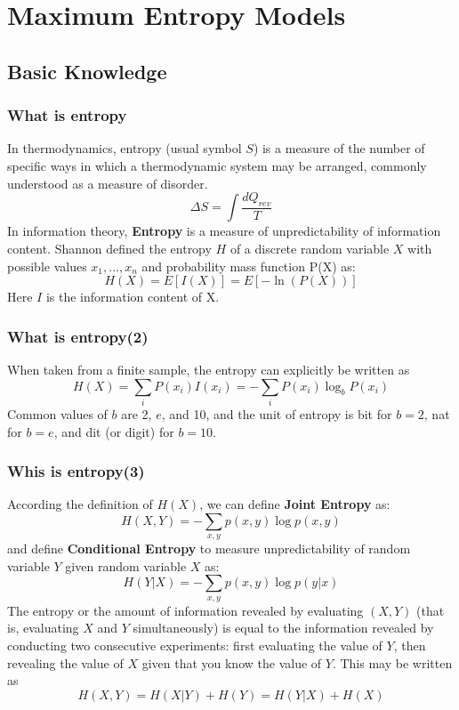 \documentclass[slidestop,compress,mathserif]{beamer}
\begin{document}
	\section{Maximum Entropy Models}
	\subsection{Basic Knowledge}
	\begin{frame}
		\frametitle{What is entropy}
		In thermodynamics, entropy (usual symbol $S$) is a measure of the number of specific ways in which a thermodynamic system may be arranged, commonly understood as a measure of disorder.
		$$\Delta S = \int\frac{dQ_{rev}}{T}$$
		In information theory, \textbf{Entropy} is a measure of unpredictability of information content. Shannon defined the entropy $H$ of a discrete random variable $X$ with possible values $x_1, ..., x_n$ and probability mass function P(X) as:
		$$H(X) = E[I(X)] = E[-\ln(P(X))]$$
		Here $I$ is the information content of X.
		
	\end{frame}
	
	\begin{frame}
		\frametitle{What is entropy(2)}
		When taken from a finite sample, the entropy can explicitly be written as
		$$H(X) = \sum_i P(x_i)I(x_i) = -\sum_i P(x_i)\log_b P(x_i)$$
		Common values of $b$ are 2, $e$, and 10, and the unit of entropy is bit for $b = 2$, nat for $b = e$, and dit (or digit) for $b = 10$.
		\begin{figure}
		\end{figure}
		
	\end{frame}
	
	\begin{frame}[shrink]
		\frametitle{Whis is entropy(3)}
		According the definition of $H(X)$, we can define \textbf{Joint Entropy} as:
		$$H(X,Y) = -\sum_{x,y}p(x,y)\log p(x,y)$$
		and  define \textbf{Conditional Entropy} to measure unpredictability of random variable $Y$ given random variable $X$ as:
		$$H(Y|X) = -\sum_{x,y} p(x,y)\log p(y|x)$$
		The entropy or the amount of information revealed by evaluating $(X,Y)$ (that is, evaluating $X$ and $Y$ simultaneously) is equal to the information revealed by conducting two consecutive experiments: first evaluating the value of $Y$, then revealing the value of $X$ given that you know the value of $Y$. This may be written as
		\begin{equation}
			H(X,Y) = H(X|Y)+H(Y)=H(Y|X)+H(X)
		\end{equation}	
	\end{frame}
	
\end{document}
